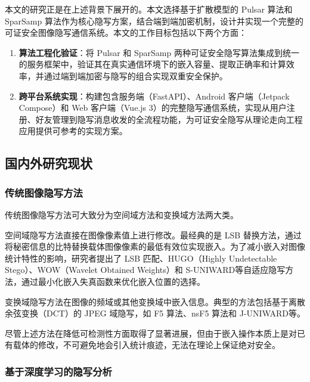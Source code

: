 本文的研究正是在上述背景下展开的。本文选择基于扩散模型的 Pulsar 算法\supercite{jois2024pulsar}和 SparSamp 算法作为核心隐写方案，结合端到端加密机制，设计并实现一个完整的可证安全图像隐写通信系统。本文的工作目标包括以下两个方面：

\begin{enumerate}
    \item \textbf{算法工程化验证}：将 Pulsar 和 SparSamp 两种可证安全隐写算法集成到统一的服务框架中，验证其在真实通信环境下的嵌入容量、提取正确率和计算效率，并通过端到端加密与隐写的组合实现双重安全保护。
    \item \textbf{跨平台系统实现}：构建包含服务端（FastAPI）、Android 客户端（Jetpack Compose）和 Web 客户端（Vue.js 3）的完整隐写通信系统，实现从用户注册、好友管理到隐写消息收发的全流程功能，为可证安全隐写从理论走向工程应用提供可参考的实现方案。
\end{enumerate}

\subsection{国内外研究现状}

\subsubsection{传统图像隐写方法}

传统图像隐写方法可大致分为空间域方法和变换域方法两大类。

空间域隐写方法直接在图像像素值上进行修改。最经典的是 LSB 替换方法，通过将秘密信息的比特替换载体图像像素的最低有效位实现嵌入\supercite{chan2004hiding}。为了减小嵌入对图像统计特性的影响，研究者提出了 LSB 匹配\supercite{mielikainen2006lsb}、HUGO（Highly Undetectable Stego）\supercite{pevny2010using}、WOW（Wavelet Obtained Weights）\supercite{holub2012designing}和 S-UNIWARD\supercite{holub2014universal}等自适应隐写方法，通过最小化嵌入失真函数来优化嵌入位置的选择。

变换域隐写方法在图像的频域或其他变换域中嵌入信息。典型的方法包括基于离散余弦变换（DCT）的 JPEG 域隐写\supercite{westfeld2001f5}，如 F5 算法、nsF5 算法\supercite{fridrich2007statistically}和 J-UNIWARD\supercite{holub2014universal}等。

尽管上述方法在降低可检测性方面取得了显著进展，但由于嵌入操作本质上是对已有载体的修改，不可避免地会引入统计痕迹，无法在理论上保证绝对安全。

\subsubsection{基于深度学习的隐写分析}

